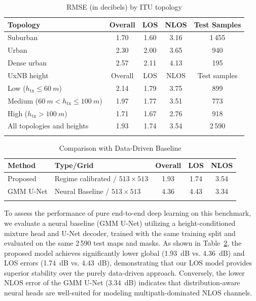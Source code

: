 \documentclass[10pt,conference,letterpaper]{IEEEtran}
\begin{document}
\begin{table}
\centering
\caption{RMSE (in decibels) by ITU topology}
\label{tab:itu-topology}
\scriptsize
\begin{tabular}{lcccc}
\toprule
Topology  & Overall & LOS & NLOS & Test Samples \\
\midrule
Suburban & 1.70 & 1.60 & 3.16 & 1\,455\\
Urban & 2.30 & 2.00 & 3.65 & 940\\
Dense urban & 2.57 & 2.11 & 4.13 & 195\\
\midrule
\midrule
UxNB height & Overall & LOS & NLOS & Test samples \\
\midrule
Low ($h_{\mathrm{tx}}\le\SI{60}{m}$) & 2.14 & 1.79 & 3.75 & 899 \\
Medium ($\SI{60}{m}<h_{\mathrm{tx}}\le\SI{100}{m}$) & 1.97 & 1.77 & 3.51 & 773 \\
High ($h_{\mathrm{tx}}>\SI{100}{m}$) & 1.71 & 1.67 & 2.76 & 918 \\
\midrule
All topologies and heights & 1.93 & 1.74 & 3.54 & 2\,590 \\
\bottomrule
\vspace{-0.6cm}
\end{tabular}
\end{table}

\begin{table}[t]
\centering
\caption{Comparison with Data-Driven Baseline}
\label{tab:accuracy-context}
\scriptsize
\setlength{\tabcolsep}{4pt}
\begin{tabular}{llccc}
\toprule
Method & Type/Grid & Overall & LOS & NLOS \\
\midrule
{Proposed} & Regime calibrated / $513\times513$ & {1.93} & {1.74} & 3.54 \\
GMM U-Net & Neural Baseline / $513\times513$  & 4.36 & 4.43 & {3.34} \\
\bottomrule
\vspace{-0.6cm}
\end{tabular}
\end{table}

To assess the performance of pure end-to-end deep learning on this benchmark, we evaluate a neural baseline (GMM U-Net) utilizing a height-conditioned mixture head and U-Net decoder, trained with the same training split and evaluated on the same 2\,590 test maps and masks. As shown in Table~\ref{tab:accuracy-context}, the proposed model achieves significantly lower global (\SI{1.93}{dB} vs. \SI{4.36}{dB}) and LOS errors (\SI{1.74}{dB} vs. \SI{4.43}{dB}), demonstrating that our LOS model provides superior stability over the purely data-driven approach. Conversely, the lower NLOS error of the GMM U-Net (\SI{3.34}{dB}) indicates that distribution-aware neural heads are well-suited for modeling multipath-dominated NLOS channels.
\end{document}
